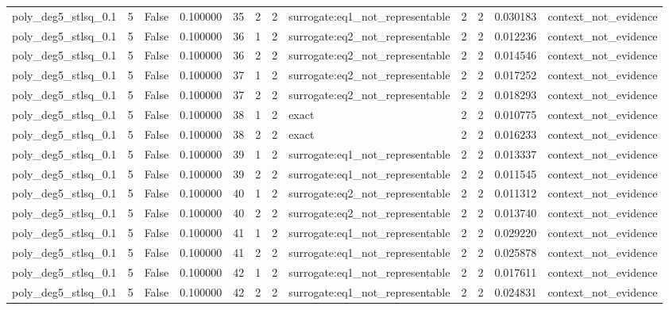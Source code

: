 \begin{tabular}{lrrrrrrlrrrl}
poly\_deg5\_stlsq\_0.1 & 5 & False & 0.100000 & 35 & 2 & 2 & surrogate:eq1\_not\_representable & 2 & 2 & 0.030183 & context\_not\_evidence \\
poly\_deg5\_stlsq\_0.1 & 5 & False & 0.100000 & 36 & 1 & 2 & surrogate:eq2\_not\_representable & 2 & 2 & 0.012236 & context\_not\_evidence \\
poly\_deg5\_stlsq\_0.1 & 5 & False & 0.100000 & 36 & 2 & 2 & surrogate:eq2\_not\_representable & 2 & 2 & 0.014546 & context\_not\_evidence \\
poly\_deg5\_stlsq\_0.1 & 5 & False & 0.100000 & 37 & 1 & 2 & surrogate:eq2\_not\_representable & 2 & 2 & 0.017252 & context\_not\_evidence \\
poly\_deg5\_stlsq\_0.1 & 5 & False & 0.100000 & 37 & 2 & 2 & surrogate:eq2\_not\_representable & 2 & 2 & 0.018293 & context\_not\_evidence \\
poly\_deg5\_stlsq\_0.1 & 5 & False & 0.100000 & 38 & 1 & 2 & exact & 2 & 2 & 0.010775 & context\_not\_evidence \\
poly\_deg5\_stlsq\_0.1 & 5 & False & 0.100000 & 38 & 2 & 2 & exact & 2 & 2 & 0.016233 & context\_not\_evidence \\
poly\_deg5\_stlsq\_0.1 & 5 & False & 0.100000 & 39 & 1 & 2 & surrogate:eq1\_not\_representable & 2 & 2 & 0.013337 & context\_not\_evidence \\
poly\_deg5\_stlsq\_0.1 & 5 & False & 0.100000 & 39 & 2 & 2 & surrogate:eq1\_not\_representable & 2 & 2 & 0.011545 & context\_not\_evidence \\
poly\_deg5\_stlsq\_0.1 & 5 & False & 0.100000 & 40 & 1 & 2 & surrogate:eq2\_not\_representable & 2 & 2 & 0.011312 & context\_not\_evidence \\
poly\_deg5\_stlsq\_0.1 & 5 & False & 0.100000 & 40 & 2 & 2 & surrogate:eq2\_not\_representable & 2 & 2 & 0.013740 & context\_not\_evidence \\
poly\_deg5\_stlsq\_0.1 & 5 & False & 0.100000 & 41 & 1 & 2 & surrogate:eq1\_not\_representable & 2 & 2 & 0.029220 & context\_not\_evidence \\
poly\_deg5\_stlsq\_0.1 & 5 & False & 0.100000 & 41 & 2 & 2 & surrogate:eq1\_not\_representable & 2 & 2 & 0.025878 & context\_not\_evidence \\
poly\_deg5\_stlsq\_0.1 & 5 & False & 0.100000 & 42 & 1 & 2 & surrogate:eq1\_not\_representable & 2 & 2 & 0.017611 & context\_not\_evidence \\
poly\_deg5\_stlsq\_0.1 & 5 & False & 0.100000 & 42 & 2 & 2 & surrogate:eq1\_not\_representable & 2 & 2 & 0.024831 & context\_not\_evidence \\

\end{tabular}
